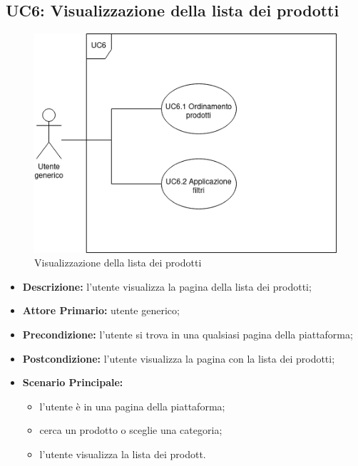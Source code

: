         \subsection{UC6: Visualizzazione della lista dei prodotti}
        \label{sec:UC6}
        \begin{figure}[!ht]
            \caption{Visualizzazione della lista dei prodotti}
            \vspace{10px}
            \includegraphics[scale=0.5]{../../../Images/AnalisiRequisiti/UC6.png}
            \centering
        \end{figure}
        \begin{itemize}
            \item \textbf{Descrizione:} l'utente visualizza la pagina della lista dei prodotti;
            \item \textbf{Attore Primario:} utente generico;
            \item \textbf{Precondizione:} l'utente si trova in una qualsiasi pagina della piattaforma;
            \item \textbf{Postcondizione:} l'utente visualizza la pagina con la lista dei prodotti;
            \item \textbf{Scenario Principale:}
            \begin{itemize}
                \item l'utente è in una pagina della piattaforma;
                \item cerca un prodotto o sceglie una categoria;
                \item l'utente visualizza la lista dei prodott.
            \end{itemize}
        \end{itemize}
